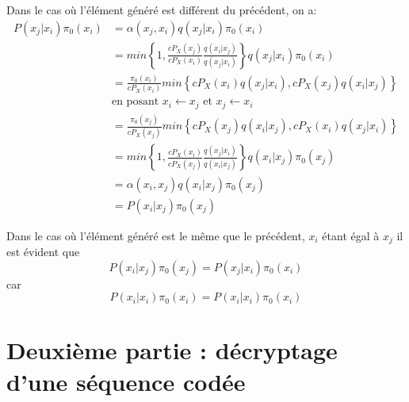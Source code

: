 \documentclass[11pt]{report}
\begin{document}
Dans le cas où l'élément généré est différent du précédent, on a:
\begin{align*}
P(x_j | x_i) \pi_0(x_i)
&= \alpha(x_j, x_i) q(x_j| x_i) \pi_0(x_i) \\
&= min \left\{1, \frac{cP_X(x_j)}{cP_X(x_i)} \frac{q(x_i|x_j)}{q(x_j|x_i)}\right\} q(x_j| x_i) \pi_0(x_i) \\
&= \frac{\pi_0(x_i)}{cP_X(x_i)} min \left\{cP_X(x_i) q(x_j|x_i), cP_X(x_j) q(x_i|x_j)\right\} \\
&\text{en posant } x_i \leftarrow x_j \text{ et } x_j \leftarrow x_i \\
&= \frac{\pi_0(x_j)}{cP_X(x_j)} min \left\{cP_X(x_j) q(x_i|x_j), cP_X(x_i) q(x_j|x_i)\right\} \\
&= min \left\{1, \frac{cP_X(x_i)}{cP_X(x_j)} \frac{q(x_j|x_i)}{q(x_i|x_j)}\right\} q(x_i| x_j) \pi_0(x_j)\\
&= \alpha(x_i, x_j) q(x_i| x_j) \pi_0(x_j) \\
&= P(x_i | x_j) \pi_0(x_j)
\end{align*} 

Dans le cas où l'élément généré est le même que le précédent, $x_i$ étant égal à $x_j$ il est évident que 
$$P(x_i | x_j) \pi_0(x_j) = P(x_j | x_i) \pi_0(x_i)$$
car 
$$P(x_i | x_i) \pi_0(x_i) = P(x_i | x_i) \pi_0(x_i)$$
\section{Deuxième partie : décryptage d’une séquence codée}
\subsubsection{}
\subsubsection{}
\subsubsection{}
\subsubsection{}
\subsubsection{}
\end{document}
